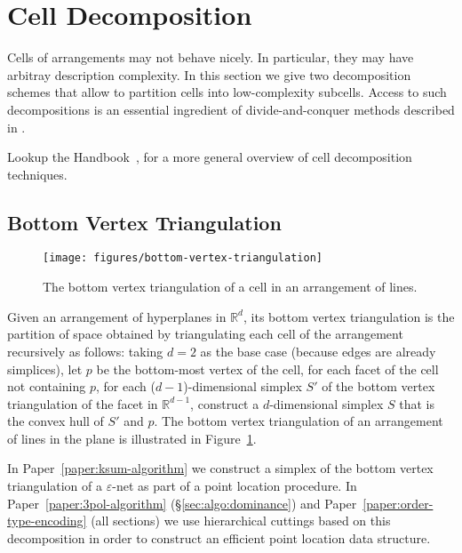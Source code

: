 \section{Cell Decomposition}%
\label{sec:arrangements:cell-decomposition}

Cells of arrangements may not behave nicely. In particular, they may have
arbitray description complexity.
%
In this section we give two decomposition schemes that allow to partition cells
into low-complexity subcells.
%
Access to such decompositions is an essential ingredient of divide-and-conquer
methods described in .

Lookup the Handbook~\cite[\S{}24.3.2]{Hal04},
for a more general overview of cell decomposition techniques.

\subsection{Bottom Vertex Triangulation}%
\label{sec:arrangements:triangulation}

\begin{figure}
  \centering{}
  \texttt{[image: figures/bottom-vertex-triangulation]}
  \caption{%
    The bottom vertex triangulation of a cell in an arrangement of lines.%
  }%
  \label{fig:bvt}
\end{figure}

Given an arrangement of hyperplanes in \(\mathbb{R}^d\), its bottom vertex
triangulation is the partition of space obtained by triangulating each cell of
the arrangement recursively as follows: taking \(d=2\) as the base case
(because edges are already simplices),
let \(p\) be the bottom-most vertex of the cell,
for each facet of the cell not containing \(p\),
for each (\(d-1\))-dimensional simplex \(S'\) of the bottom vertex triangulation
of the facet in \(\mathbb{R}^{d-1}\),
construct a \(d\)-dimensional simplex \(S\) that is the convex hull of
\(S'\) and \(p\).
%
The
bottom vertex triangulation of an arrangement of lines in the plane is illustrated
in Figure~\ref{fig:bvt}.

In Paper~\ref{paper:ksum-algorithm} we construct a simplex of the bottom vertex
triangulation of a \(\varepsilon\)-net as part of a point location procedure.
%
In Paper~\ref{paper:3pol-algorithm} (\S\ref{sec:algo:dominance})
and Paper~\ref{paper:order-type-encoding} (all sections)
we use hierarchical cuttings based on this decomposition in order to construct
an efficient point location data structure.

